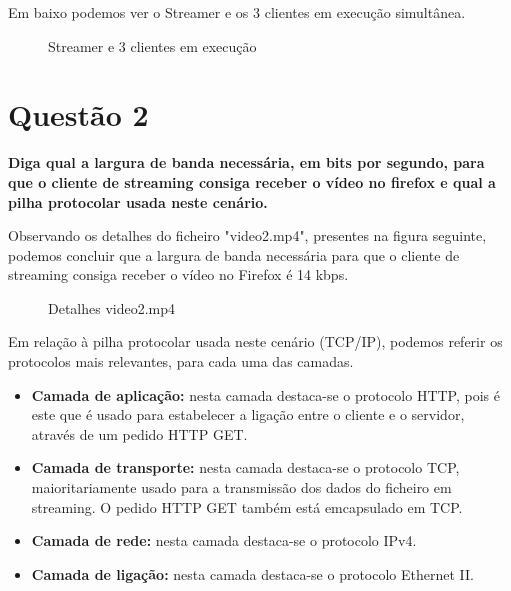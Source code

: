 \documentclass[a4paper, 11pt]{article}
\begin{document}
Em baixo podemos ver o Streamer e os 3 clientes em execução simultânea.

\begin{figure}[H]
    \centering
    \caption{Streamer e 3 clientes em execução}
\end{figure}


\section{Questão 2}
\textbf{Diga qual a largura de banda necessária, em bits por segundo, para que o cliente de streaming consiga receber o
vídeo no firefox e qual a pilha protocolar usada neste cenário.}
\vspace{0.25cm}

Observando os detalhes do ficheiro "video2.mp4", presentes na figura seguinte, podemos concluir que a largura de banda necessária para que o cliente de streaming consiga receber o vídeo no Firefox é 14 kbps.

\begin{figure}[H]
    \centering
    \caption{Detalhes video2.mp4}
\end{figure}

Em relação à pilha protocolar usada neste cenário (TCP/IP), podemos referir os protocolos mais relevantes, para cada uma das camadas.

\begin{itemize}
    \item \textbf{Camada de aplicação:} nesta camada destaca-se o protocolo HTTP, pois é este que é usado para estabelecer a ligação entre o cliente e o servidor, através de um pedido HTTP GET.
    \item \textbf{Camada de transporte:} nesta camada destaca-se o protocolo TCP, maioritariamente usado para a transmissão dos dados do ficheiro em streaming. O pedido HTTP GET também está emcapsulado em TCP.
    \item \textbf{Camada de rede:} nesta camada destaca-se o protocolo IPv4.
    \item \textbf{Camada de ligação:} nesta camada destaca-se o protocolo Ethernet II.
\end{itemize}
\end{document}
